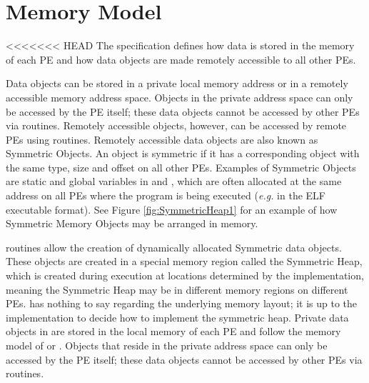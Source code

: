 \section{Memory Model}

<<<<<<< HEAD
The \openshmem specification defines how data is stored in the memory
of each \ac{PE} and how data objects are made remotely accessible to all
other \ac{PE}s.

Data objects can be stored in a private local memory address or in
a remotely accessible memory address space. Objects in the private
address space can only be accessed by the \ac{PE} itself; these data objects
cannot be accessed by other \ac{PE}s via \openshmem routines. Remotely accessible
objects, however, can be accessed by remote \ac{PE}s using \openshmem routines.
Remotely accessible data objects are also known as Symmetric Objects.
An object is symmetric if it has a corresponding object with the same
type, size and offset on all other \ac{PE}s. Examples of Symmetric Objects
are static and global variables in \Clang{} and \Cpp, which are often allocated
at the same address on all \ac{PE}s where the program is being executed
(\emph{e.g.} in the ELF executable format). See Figure \ref{fig:SymmetricHeap1}
for an example of how Symmetric Memory Objects may be arranged in
memory.

\openshmem routines allow the creation of dynamically allocated Symmetric
data objects. These objects are created in a special memory region
called the Symmetric Heap, which is created during execution at locations
determined by the implementation, meaning the Symmetric Heap may be
in different memory regions on different \ac{PE}s. \openshmem has nothing
to say regarding the underlying memory layout; it is up to the implementation
to decide how to implement the symmetric heap. Private data objects in \openshmem are stored in the local memory of each \ac{PE} 
and follow the memory model of \Clang{} or \Fortran{}. Objects that reside in the private address space can only be accessed by the PE itself; these data objects
cannot be accessed by other PEs via \openshmem{} routines. 



%

